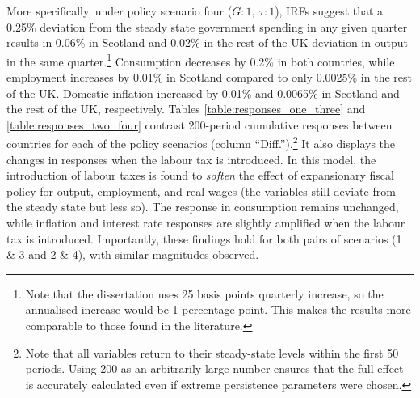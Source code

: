 More specifically, under policy scenario four ($G:1,\ \tau:1$), IRFs suggest that a 0.25\% deviation from the steady state government spending in any given quarter results in 0.06\% in Scotland and 0.02\% in the rest of the UK deviation in output in the same quarter.\footnote{Note that the dissertation uses 25 basis points quarterly increase, so the annualised increase would be 1 percentage point. This makes the results more comparable to those found in the literature.} Consumption decreases by 0.2\% in both countries, while employment increases by 0.01\% in Scotland compared to only 0.0025\% in the rest of the UK. Domestic inflation increased by 0.01\% and 0.0065\% in Scotland and the rest of the UK, respectively. Tables \ref{table:responses_one_three} and \ref{table:responses_two_four} contrast 200-period cumulative responses between countries for each of the policy scenarios (column ``Diff.'').\footnote{Note that all variables return to their steady-state levels within the first 50 periods. Using 200 as an arbitrarily large number ensures that the full effect is accurately calculated even if extreme persistence parameters were chosen.} It also displays the changes in responses when the labour tax is introduced. In this model, the introduction of labour taxes is found to \textit{soften} the effect of expansionary fiscal policy for output, employment, and real wages (the variables still deviate from the steady state but less so). The response in consumption remains unchanged, while inflation and interest rate responses are slightly amplified when the labour tax is introduced. Importantly, these findings hold for both pairs of scenarios (1 \& 3 and 2 \& 4), with similar magnitudes observed.

